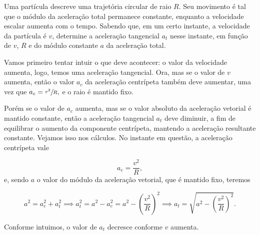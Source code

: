 \vspace{0.3cm}

\begin{exemplo}[Nível II]\label{exemplo_cinematicavetorial_aceleracaotangencialex02}

Uma partícula descreve uma trajetória circular de raio $R$. Seu movimento é tal que o módulo da aceleração total permanece constante, enquanto a velocidade escalar aumenta com o tempo. Sabendo que, em um certo instante, a velocidade da partícula é $v$, determine a aceleração tangencial $a_t$ nesse instante, em função de $v$, $R$ e do módulo constante $a$ da aceleração total.

\resolucao

Vamos primeiro tentar intuir o que deve acontecer: o valor da velocidade aumenta, logo, temos uma aceleração tangencial. Ora, mas se o valor de $v$ aumenta, então o valor $a_c$ da aceleração centrípeta também deve aumentar, uma vez que $a_c = \sfrac{v^2}{R},$ e o raio é mantido fixo.

Porém se o valor de $a_c$ aumenta, mas se o valor absoluto da aceleração vetorial é mantido constante, então a aceleração tangencial $a_t$ deve diminuir, a fim de equilibrar o aumento da componente centrípeta, mantendo a aceleração resultante constante. Vejamos isso nos cálculos. No instante em questão, a aceleração centrípeta vale

$$ a_c = \dfrac{v^2}{R},$$
\noindent e, sendo $a$ o valor do módulo da aceleração vetorial, que é mantido fixo, teremos

$$ a^2 = a_c^2 + a_t^2 \implies a_t^2 = a^2 - a_c^2=a^2 - \left(\dfrac{v^2}{R} \right)^2 \implies \boxed{a_t=\sqrt{a^2-\left(\dfrac{v^2}{R} \right)^2}.}$$

Conforme intuimos, o valor de $a_t$ decresce conforme $v$ aumenta.
    
\end{exemplo}



\vspace{0.3cm}





